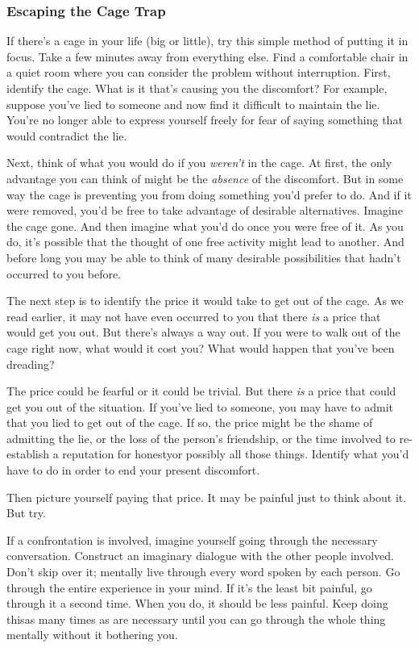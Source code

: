 {  \subsubsection*{Escaping the Cage Trap}
  \newReading If there's a cage in your life (big or little), try this simple
  method of putting it in focus.
  Take a few minutes away from everything else. Find a comfortable chair in a
  quiet room where you can consider the problem without interruption. First,
  identify the cage. What is it that's causing you the discomfort? For example,
  suppose you've lied to someone and now find it difficult to maintain the lie.
  You're no longer able to express yourself freely for fear of saying something
  that would contradict the lie.

  Next, think of what you would do if you \textit{weren't} in the cage. At
  first, the only advantage you can think of might be the \textit{absence} of
  the discomfort. But in some way the cage is preventing you from doing
  something you'd prefer to do. And if it were removed, you'd be free to take
  advantage of desirable alternatives. Imagine the cage gone. And then imagine
  what you'd do once you were free of it. As you do, it's possible that the
  thought of one free activity might lead to another. And before long you may be
  able to think of many desirable possibilities that hadn't occurred to you
  before.

  \newReading The next step is to identify the price it would take to get out of
  the cage. As we read earlier, it may not have even occurred to you that there
  \textit{is} a price that would get you out.
  But there's always a way out. If you were to walk out of the cage right now,
  what would it cost you? What would happen that you've been dreading?

  The price could be fearful or it could be trivial. But there \textit{is} a
  price that could get you out of the situation. If you've lied to someone, you
  may have to admit that you lied to get out of the cage. If so, the price might
  be the shame of admitting the lie, or the loss of the person's friendship, or
  the time involved to re-establish a reputation for honesty\textemdash{}or
  possibly all those things. Identify what you'd have to do in order to end your
  present discomfort.

  Then picture yourself paying that price. It may be painful just to think about
  it. But try.

  \newReading If a confrontation is involved, imagine yourself going through the
  necessary conversation. Construct an imaginary dialogue with the other people
  involved. Don't skip over it; mentally live through every word spoken by each
  person. Go through the entire experience in your mind. If it's the least bit
  painful, go through it a second time. When you do, it should be less painful.
  Keep doing this\textemdash{}as many times as are necessary until you can go
  through the whole thing mentally without it bothering you.

}
